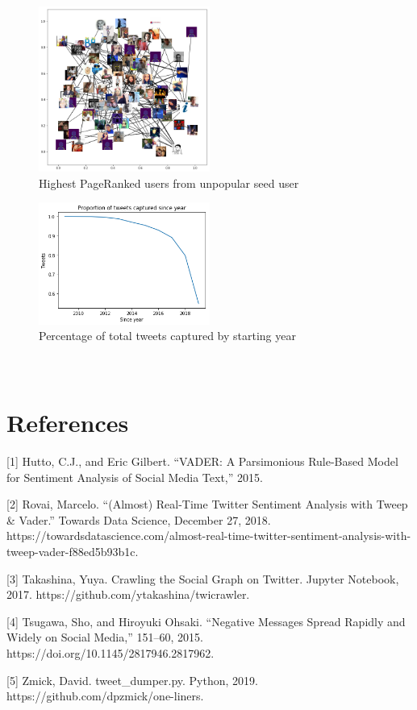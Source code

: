 \documentclass[11pt]{article}
\begin{document}
\begin{figure}[h!]
    \centering
     \includegraphics[width=0.5\textwidth]{nxgraph_unpopular_seed}
        \caption{Highest PageRanked users from unpopular seed user}
\end{figure}

\begin{figure}[h!]
    \centering
     \includegraphics[width=0.5\textwidth]{tweets_since_year}
        \caption{Percentage of total tweets captured by starting year}
\end{figure}

\section{\\References}

[1] Hutto, C.J., and Eric Gilbert. “VADER: A Parsimonious Rule-Based Model for Sentiment Analysis of Social Media Text,” 2015.\newline

[2] Rovai, Marcelo. “(Almost) Real-Time Twitter Sentiment Analysis with Tweep \& Vader.” Towards Data Science, December 27, 2018. https://towardsdatascience.com/almost-real-time-twitter-sentiment-analysis-with-tweep-vader-f88ed5b93b1c.\newline

[3] Takashina, Yuya. Crawling the Social Graph on Twitter. Jupyter Notebook, 2017. https://github.com/ytakashina/twicrawler.\newline

[4] Tsugawa, Sho, and Hiroyuki Ohsaki. “Negative Messages Spread Rapidly and Widely on Social Media,” 151–60, 2015. https://doi.org/10.1145/2817946.2817962.\newline

[5] Zmick, David. tweet\_dumper.py. Python, 2019. https://github.com/dpzmick/one-liners.
\end{document}
